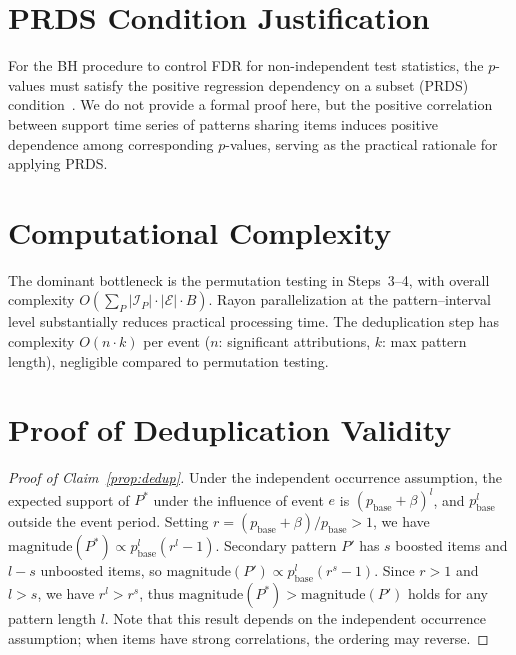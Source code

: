 \section{PRDS Condition Justification}\label{app:prds}

For the BH procedure to control FDR for non-independent test statistics,
the $p$-values must satisfy the positive regression dependency on a subset (PRDS)
condition~\cite{benjamini2001control}.
We do not provide a formal proof here, but the positive correlation between support
time series of patterns sharing items induces positive dependence among
corresponding $p$-values, serving as the practical rationale for applying PRDS.

\section{Computational Complexity}\label{app:complexity}

The dominant bottleneck is the permutation testing in Steps~3--4,
with overall complexity $O\!\left(\sum_{P} |\mathcal{I}_P| \cdot |\mathcal{E}| \cdot B\right)$.
Rayon parallelization at the pattern--interval level substantially reduces
practical processing time.
The deduplication step has complexity $O(n \cdot k)$ per event
($n$: significant attributions, $k$: max pattern length),
negligible compared to permutation testing.

\section{Proof of Deduplication Validity}\label{app:dedup_proof}

\begin{proof}[Proof of Claim~\ref{prop:dedup}]
Under the independent occurrence assumption,
the expected support of $P^*$ under the influence of event $e$ is $(p_{\text{base}} + \beta)^l$,
and $p_{\text{base}}^l$ outside the event period.
Setting $r = (p_{\text{base}} + \beta) / p_{\text{base}} > 1$,
we have $\text{magnitude}(P^*) \propto p_{\text{base}}^l (r^l - 1)$.
Secondary pattern $P'$ has $s$ boosted items and $l - s$ unboosted items, so
$\text{magnitude}(P') \propto p_{\text{base}}^l (r^s - 1)$.
Since $r > 1$ and $l > s$, we have $r^l > r^s$,
thus $\text{magnitude}(P^*) > \text{magnitude}(P')$ holds for any pattern length $l$.
Note that this result depends on the independent occurrence assumption;
when items have strong correlations, the ordering may reverse.
\end{proof}

